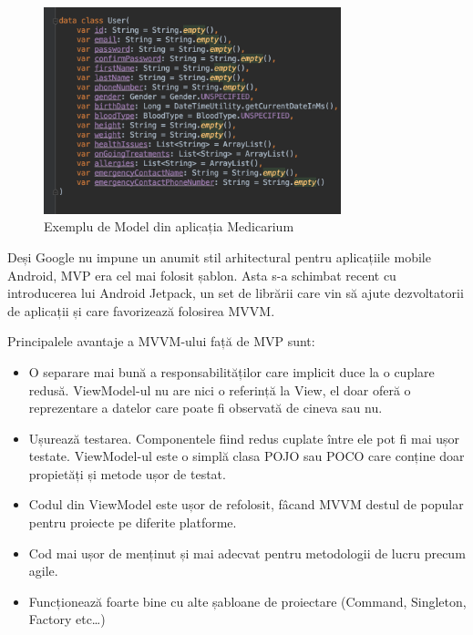 \documentclass[12pt]{article}
\begin{document}
\begin{enumerate}
    \begin{figure}[H]
        \centering
        \includegraphics[height=6cm]{model.png}
        \caption{Exemplu de Model din aplicația Medicarium}
        \end{figure}

\end{enumerate}

Deși Google nu impune un anumit stil arhitectural pentru aplicațiile mobile Android, MVP
era cel mai folosit șablon. Asta s-a schimbat recent cu introducerea lui Android
Jetpack, un set de librării care vin să ajute dezvoltatorii de aplicații și care
favorizează folosirea MVVM.

Principalele avantaje a MVVM-ului față de MVP sunt:
\begin{itemize}
    \item O separare mai bună a responsabilităților care implicit duce la o cuplare
    redusă. ViewModel-ul nu are nici o referință la View, el doar oferă o reprezentare
    a datelor care poate fi observată de cineva sau nu.
    \item Ușurează testarea. Componentele fiind redus cuplate între ele pot fi 
    mai ușor testate. ViewModel-ul este o simplă clasa POJO sau POCO care conține
    doar propietăți și metode ușor de testat.
    \item Codul din ViewModel este ușor de refolosit, fâcand MVVM destul de popular pentru proiecte pe diferite platforme.
    \item Cod mai ușor de menținut și mai adecvat pentru metodologii de lucru precum
    agile.
    \item Funcționează foarte bine cu alte șabloane de proiectare (Command, Singleton, 
    Factory etc\dots)

\end{itemize}
\end{document}
